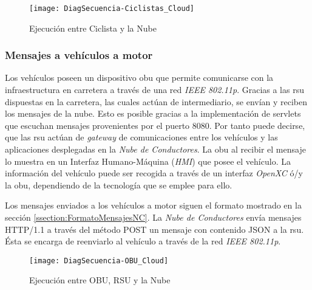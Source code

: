 \begin{figure}[H]
	\begin{center}
		\texttt{[image: DiagSecuencia-Ciclistas\_Cloud]}
		\caption{Ejecución entre Ciclista y la Nube}
		\label{fig:DiagSecuencia-OBU_Cloud}
	\end{center}
\end{figure}

\subsubsection{Mensajes a vehículos a motor}\label{sssection:mensajesvehiculomotor}
Los vehículos poseen un dispositivo \gls{obu} que permite comunicarse con la infraestructura
en carretera a través de una red \emph{IEEE 802.11p}. Gracias a las \gls{rsu} dispuestas
en la carretera, las cuales actúan de intermediario, se envían y reciben los mensajes
de la nube. Esto es posible gracias a la implementación de servlets que escuchan mensajes
provenientes por el puerto 8080. Por tanto puede decirse, que las \gls{rsu} actúan de
\emph{gateway} de comunicaciones entre los vehículos y las aplicaciones desplegadas
en la \emph{Nube de Conductores}. La \gls{obu} al recibir el mensaje lo muestra en
un Interfaz Humano-Máquina (\emph{HMI}) que posee el vehículo. La información del vehículo
puede ser recogida a través de un interfaz \emph{OpenXC} ó/y la \gls{obu}, dependiendo
de la tecnología que se emplee para ello.

Los mensajes enviados a los vehículos a motor siguen el formato mostrado en la sección
\ref{ssection:FormatoMensajesNC}. La \emph{Nube de Conductores} envía mensajes HTTP/1.1
a través del método POST un mensaje con contenido JSON a la \gls{rsu}. Ésta se encarga
de reenviarlo al vehículo a través de la red \emph{IEEE 802.11p}.

\begin{figure}[H]
	\begin{center}
		\texttt{[image: DiagSecuencia-OBU\_Cloud]}
		\caption{Ejecución entre OBU, RSU y la Nube}
		\label{fig:DiagSecuencia-OBU_Cloud}
	\end{center}
\end{figure}

